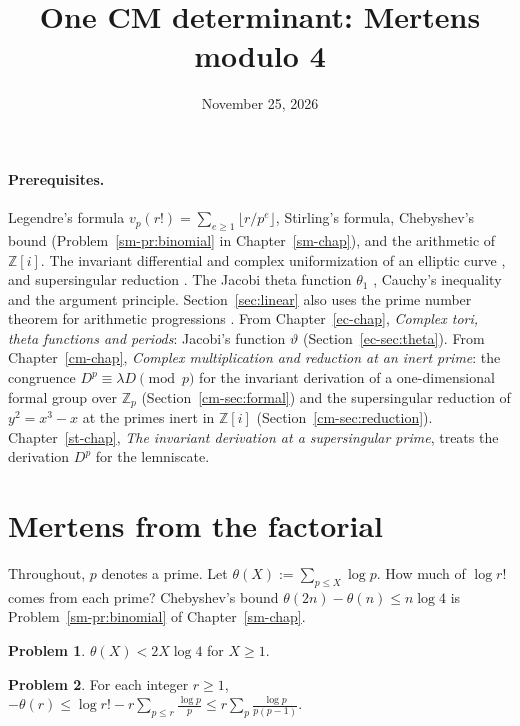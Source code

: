 \documentclass[reqno]{amsart}
\title{One CM determinant: Mertens modulo 4}
\author{}
\date{November 25, 2026}
\newcounter{chap}
\theoremstyle{definition}
\newtheorem{problem}{Problem}[section]
\theoremstyle{plain}
\newcommand{\Z}{\mathbb{Z}}
\newcommand{\Zi}{\Z[i]}
\begin{document}
\maketitle
{}\label{chap}

\paragraph{Prerequisites.}
Legendre's formula \(v_p(r!) = \sum_{e \ge 1} \lfloor r/p^e \rfloor\), Stirling's formula, Chebyshev's bound (Problem~\ref{sm-pr:binomial} in Chapter~\ref{sm-chap}), and the arithmetic of \(\Zi\).  The invariant differential and complex uniformization of an elliptic curve \cite[\S III.5, Ch.~VI]{Si1}, and supersingular reduction \cite[\S V.4]{Si1}.  The Jacobi theta function \(\theta_1\) \cite[\S20.2]{DLMF}, Cauchy's inequality and the argument principle.  Section~\ref{sec:linear} also uses the prime number theorem for arithmetic progressions \cite[\S11.3]{MV}.  From Chapter~\ref{ec-chap}, \emph{Complex tori, theta functions and periods}: Jacobi's function \(\vartheta\) (Section~\ref{ec-sec:theta}).  From Chapter~\ref{cm-chap}, \emph{Complex multiplication and reduction at an inert prime}: the congruence \(D^p \equiv \lambda D \pmod p\) for the invariant derivation of a one-dimensional formal group over \(\Z_p\) (Section~\ref{cm-sec:formal}) and the supersingular reduction of \(y^2 = x^3 - x\) at the primes inert in \(\Zi\) (Section~\ref{cm-sec:reduction}).  Chapter~\ref{st-chap}, \emph{The invariant derivation at a supersingular prime}, treats the derivation \(D^p\) for the lemniscate.

\section{Mertens from the factorial}\label{sec:factorial}

Throughout, \(p\) denotes a prime.  Let \(\theta(X) := \sum_{p \le X} \log p\).  How much of \(\log r!\) comes from each prime?  Chebyshev's bound \(\theta(2n) - \theta(n) \le n \log 4\) is Problem~\ref{sm-pr:binomial} of Chapter~\ref{sm-chap}.

\begin{problem}\label{pr:chebyshev}
\(\theta(X) < 2X\log 4\) for \(X \ge 1\).
\end{problem}

\begin{problem}\label{pr:factorial}
For each integer \(r \ge 1\),
\(-\theta(r) \le \log r! - r \sum_{p \le r} \frac{\log p}{p} \le r \sum_p \frac{\log p}{p(p-1)}\).
\end{problem}
\end{document}
